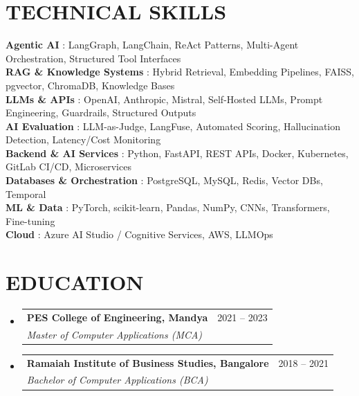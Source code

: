 \documentclass[letterpaper,10pt]{article}
\makeatletter
\newcommand{\resumeSubheading}[4]{
  \vspace{-2pt}\item 
    \begin{tabular*}{\textwidth}[t]{l@{\extracolsep{\fill}}r}
      \textbf{#1} & {\color{dark-grey}\small #2}\vspace{1pt}\\ 
      \textit{#3} & {\color{dark-grey} \small #4}\\ 
    \end{tabular*}\vspace{-6pt} 
}
\newcommand{\resumeSubHeadingListStart}{\begin{itemize}[leftmargin=0in, label={}]}
\newcommand{\resumeSubHeadingListEnd}{\end{itemize}\vspace{-8pt}}
\makeatother
\begin{document}
\section{TECHNICAL SKILLS}
 \begin{itemize}[leftmargin=0in, label={}]
    \small{\item{
     \textbf{Agentic AI} {: LangGraph, LangChain, ReAct Patterns, Multi-Agent Orchestration, Structured Tool Interfaces}\vspace{2pt} \\
     \textbf{RAG \& Knowledge Systems} {: Hybrid Retrieval, Embedding Pipelines, FAISS, pgvector, ChromaDB, Knowledge Bases}\vspace{2pt} \\
     \textbf{LLMs \& APIs} {: OpenAI, Anthropic, Mistral, Self-Hosted LLMs, Prompt Engineering, Guardrails, Structured Outputs}\vspace{2pt} \\
     \textbf{AI Evaluation} {: LLM-as-Judge, LangFuse, Automated Scoring, Hallucination Detection, Latency/Cost Monitoring}\vspace{2pt} \\
     \textbf{Backend \& AI Services} {: Python, FastAPI, REST APIs, Docker, Kubernetes, GitLab CI/CD, Microservices}\vspace{2pt} \\
     \textbf{Databases \& Orchestration} {: PostgreSQL, MySQL, Redis, Vector DBs, Temporal}\vspace{2pt} \\
     \textbf{ML \& Data} {: PyTorch, scikit-learn, Pandas, NumPy, CNNs, Transformers, Fine-tuning}\vspace{2pt} \\
     \textbf{Cloud} {: Azure AI Studio / Cognitive Services, AWS, LLMOps}
    }}
 \end{itemize}
\section {EDUCATION}
  \resumeSubHeadingListStart
    \resumeSubheading
      {PES College of Engineering, Mandya}{2021 -- 2023}
      {Master of Computer Applications (MCA)}{}
    \resumeSubheading
      {Ramaiah Institute of Business Studies, Bangalore}{2018 -- 2021}
      {Bachelor of Computer Applications (BCA)}{}
  \resumeSubHeadingListEnd

\end{document}
